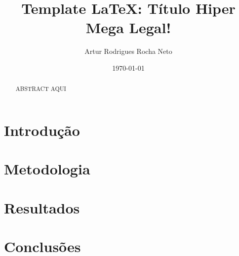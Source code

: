 \documentclass[a4paper]{article}
\title{Template \LaTeX: Título Hiper Mega Legal!}
\author{Artur Rodrigues Rocha Neto}
\date{\today}
\begin{document}
\maketitle

\begin{abstract}
ABSTRACT AQUI
\end{abstract}

\section{Introdução}

\section{Metodologia}

\section{Resultados}

\section{Conclusões}

\begin{footnotesize}
    
    
\end{footnotesize}
\end{document}
